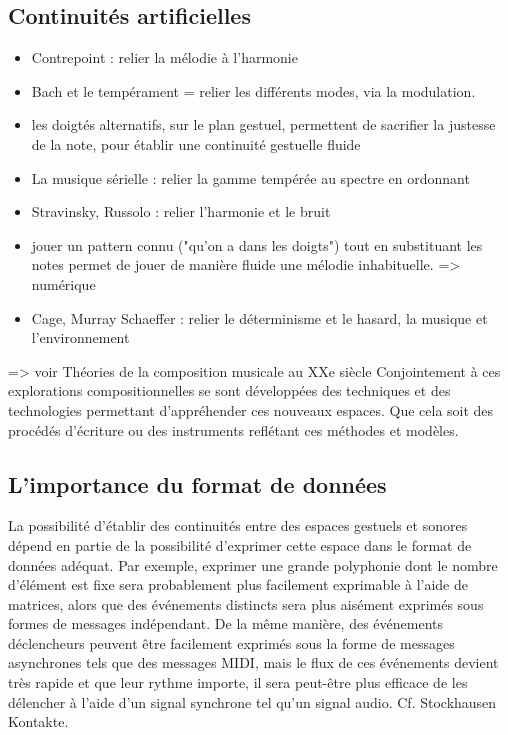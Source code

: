 \subsection{Continuités artificielles}

\vspace{-1em}
\begin{itemize}[noitemsep]
\item Contrepoint : relier la mélodie à l'harmonie 
\item Bach et le tempérament = relier les différents modes, via la modulation.
\item les doigtés alternatifs, sur le plan gestuel, permettent de sacrifier la justesse de la note, pour établir une continuité gestuelle fluide
\item La musique sérielle : relier la gamme tempérée au spectre en ordonnant 
\item Stravinsky, Russolo : relier l’harmonie et le bruit 
\item jouer un pattern connu ("qu'on a dans les doigts") tout en substituant les notes permet de jouer de manière fluide une mélodie inhabituelle. => numérique
\item Cage, Murray Schaeffer : relier le déterminisme et le hasard, la musique et l’environnement 
\end{itemize}

=> voir Théories de la composition musicale au XXe siècle 
Conjointement à ces explorations compositionnelles se sont développées des techniques et des technologies permettant d’appréhender ces nouveaux espaces. Que cela soit des procédés d’écriture ou des instruments reflétant ces méthodes et modèles.

\subsection{L'importance du format de données}
La possibilité d'établir des continuités entre des espaces gestuels et sonores dépend en partie de la possibilité d'exprimer cette espace dans le format de données adéquat. Par exemple, exprimer une grande polyphonie dont le nombre d'élément est fixe sera probablement plus facilement exprimable à l'aide de matrices, alors que des événements distincts sera plus aisément exprimés sous formes de messages indépendant. De la même manière, des événements déclencheurs peuvent être facilement exprimés sous la forme de messages asynchrones tels que des messages MIDI, mais le flux de ces événements devient très rapide et que leur rythme importe, il sera peut-être plus efficace de les délencher à l'aide d'un signal synchrone tel qu'un signal audio. Cf. Stockhausen Kontakte.



